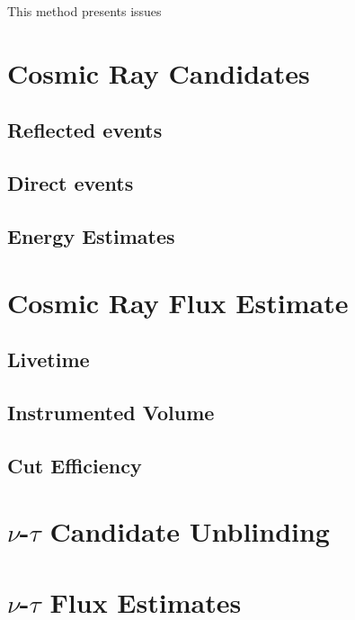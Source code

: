		This method presents issues 
		


\section{Cosmic Ray Candidates}

	\subsection{Reflected events}
	
	\subsection{Direct events}
	
	\subsection{Energy Estimates}


\section{Cosmic Ray Flux Estimate}

	\subsection{Livetime}

	\subsection{Instrumented Volume}
	
	\subsection{Cut Efficiency}
	



\section{$\nu$-$\tau$ Candidate Unblinding}

\section{$\nu$-$\tau$ Flux Estimates}




